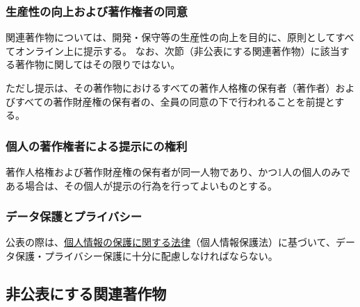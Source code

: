 \subsubsection{生産性の向上および著作権者の同意}
関連著作物については、開発・保守等の生産性の向上を目的に、原則としてすべてオンライン上に提示する。
なお、次節（非公表にする関連著作物）に該当する著作物に関してはその限りではない。

ただし提示は、その著作物におけるすべての著作人格権の保有者（著作者）およびすべての著作財産権の保有者の、全員の同意の下で行われることを前提とする。


\subsubsection{個人の著作権者による提示にの権利\label{subsec:individualright}}
著作人格権および著作財産権の保有者が同一人物であり、かつ1人の個人のみである場合は、その個人が提示の行為を行ってよいものとする。

\subsubsection{データ保護とプライバシー}
公表の際は、\href{https://elaws.e-gov.go.jp/document?lawid=415AC0000000057}{個人情報の保護に関する法律}（個人情報保護法）\cite{online:eGovPersonalInfoProtectionLaw}に基づいて、データ保護・プライバシー保護に十分に配慮しなければならない。


\subsection{非公表にする関連著作物}

